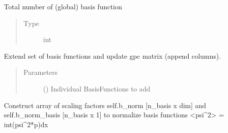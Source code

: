 \documentclass[letterpaper,10pt,english,openany,oneside]{sphinxmanual}
\begin{document}
\begin{fulllineitems}
\begin{fulllineitems}
\label{\detokenize{pygpc:pygpc.Basis.Basis.n_basis}}
Total number of (global) basis function
\begin{quote}\begin{description}
\item[{Type}] \leavevmode
int

\end{description}\end{quote}

\end{fulllineitems}


\begin{fulllineitems}
\label{\detokenize{pygpc:pygpc.Basis.Basis.extend_basis}}
Extend set of basis functions and update gpc matrix (append columns).
\begin{quote}\begin{description}
\item[{Parameters}] \leavevmode
{} (\sphinxstyleliteralemphasis{\sphinxupquote{ {[}}}\sphinxstyleliteralemphasis{\sphinxupquote{{]}}}) \textendash{} Individual BasisFunctions to add

\end{description}\end{quote}

\end{fulllineitems}


\begin{fulllineitems}
\label{\detokenize{pygpc:pygpc.Basis.Basis.init_b_norm}}
Construct array of scaling factors self.b\_norm {[}n\_basis x dim{]} and self.b\_norm\_basis {[}n\_basis x 1{]}
to normalize basis functions \textless{}psi\textasciicircum{}2\textgreater{} = int(psi\textasciicircum{}2*p)dx

\end{fulllineitems}


\end{fulllineitems}
\end{document}
